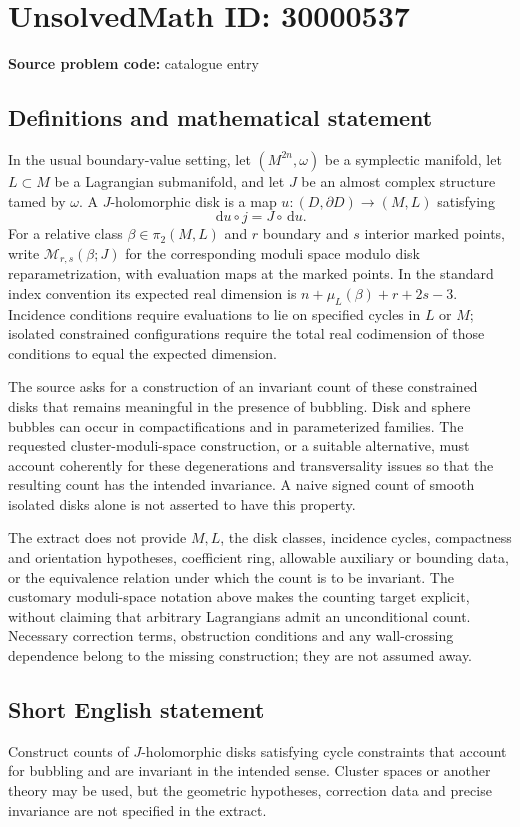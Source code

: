 \documentclass[11pt]{article}
\newcommand{\dd}{\,\mathrm{d}}
\begin{document}
\section*{UnsolvedMath ID: 30000537}
\textbf{Source problem code:} catalogue entry
\subsection{Definitions and mathematical statement}
In the usual boundary-value setting, let $(M^{2n},\omega)$ be a symplectic manifold, let $L\subset M$ be a Lagrangian submanifold, and let $J$ be an almost complex structure tamed by $\omega$. A $J$-holomorphic disk is a map $u:(D,\partial D)\to(M,L)$ satisfying
\[
\dd u\circ j=J\circ\dd u.
\]
For a relative class $\beta\in\pi_2(M,L)$ and $r$ boundary and $s$ interior marked points, write $\mathcal M_{r,s}(\beta;J)$ for the corresponding moduli space modulo disk reparametrization, with evaluation maps at the marked points. In the standard index convention its expected real dimension is $n+\mu_L(\beta)+r+2s-3$. Incidence conditions require evaluations to lie on specified cycles in $L$ or $M$; isolated constrained configurations require the total real codimension of those conditions to equal the expected dimension.

The source asks for a construction of an invariant count of these constrained disks that remains meaningful in the presence of bubbling. Disk and sphere bubbles can occur in compactifications and in parameterized families. The requested cluster-moduli-space construction, or a suitable alternative, must account coherently for these degenerations and transversality issues so that the resulting count has the intended invariance. A naive signed count of smooth isolated disks alone is not asserted to have this property.

The extract does not provide $M,L$, the disk classes, incidence cycles, compactness and orientation hypotheses, coefficient ring, allowable auxiliary or bounding data, or the equivalence relation under which the count is to be invariant. The customary moduli-space notation above makes the counting target explicit, without claiming that arbitrary Lagrangians admit an unconditional count. Necessary correction terms, obstruction conditions and any wall-crossing dependence belong to the missing construction; they are not assumed away.
\subsection{Short English statement}
Construct counts of $J$-holomorphic disks satisfying cycle constraints that account for bubbling and are invariant in the intended sense. Cluster spaces or another theory may be used, but the geometric hypotheses, correction data and precise invariance are not specified in the extract.
\end{document}

